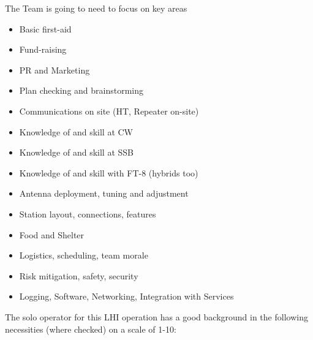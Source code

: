 \documentclass[11pt]{article}
\begin{document}
The Team is going to need to focus on key areas

\begin{itemize}
\item Basic first-aid
\item Fund-raising
\item PR and Marketing
\item Plan checking and brainstorming
\item Communications on site (HT, Repeater on-site)
\item Knowledge of and skill at CW
\item Knowledge of and skill at SSB
\item Knowledge of and skill with FT-8 (hybrids too)
\item Antenna deployment, tuning and adjustment
\item Station layout, connections, features
\item Food and Shelter
\item Logistics, scheduling, team morale
\item Risk mitigation, safety, security
\item Logging, Software, Networking, Integration with Services
\end{itemize}

\par

The solo operator for this LHI operation has a good background
in the following necessities (where checked) on a scale of 1-10:
\vskip2mm
\end{document}
